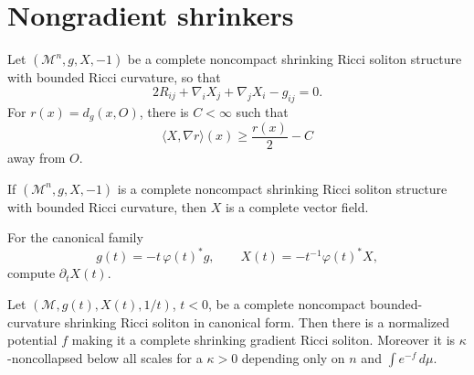\section{Nongradient shrinkers}

\begin{lemma}
\label{lem:chow-iv-shrinker-vector-field-radial-bound}
Let \((\mathcal M^n,g,X,-1)\) be a complete noncompact shrinking Ricci
soliton structure with bounded Ricci curvature, so that
\[
 2R_{ij}+\nabla_iX_j+\nabla_jX_i-g_{ij}=0.
\]
For \(r(x)=d_g(x,O)\), there is \(C<\infty\) such that
\[
 \langle X,\nabla r\rangle(x)\geq\frac{r(x)}2-C
\]
away from \(O\).
\end{lemma}

\begin{lemma}
\label{lem:chow-iv-shrinker-vector-field-complete}
If \((\mathcal M^n,g,X,-1)\) is a complete noncompact shrinking Ricci
soliton structure with bounded Ricci curvature, then \(X\) is a complete
vector field.
\end{lemma}

\begin{example}
\label{ex:chow-iv-shrinker-vector-field-evolution}
For the canonical family
\[
 g(t)=-t\,\varphi(t)^*g,
 \qquad X(t)=-t^{-1}\varphi(t)^*X,
\]
compute \(\partial_tX(t)\).
\end{example}

\begin{theorem}
\label{thm:chow-iv-bounded-curvature-shrinker-gradient-noncollapsed}
Let \((\mathcal M,g(t),X(t),1/t)\), \(t<0\), be a complete noncompact
bounded-curvature shrinking Ricci soliton in canonical form.  Then there is a
normalized potential \(f\) making it a complete shrinking gradient Ricci
soliton.  Moreover it is \(\kappa\)-noncollapsed below all scales for a
\(\kappa>0\) depending only on \(n\) and \(\int e^{-f}\,d\mu\).
\end{theorem}
